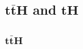 %
%
%
%
%
%
%
%
%
%

\FloatBarrier
\subsection{\texorpdfstring{$\boldsymbol{t\bar{t}H}$}{ttH} and \texorpdfstring{$\boldsymbol{tH}$}{tH}}
%

\FloatBarrier
\subsubsection{\texorpdfstring{$\boldsymbol{t\bar{t}H}$}{ttH}}

